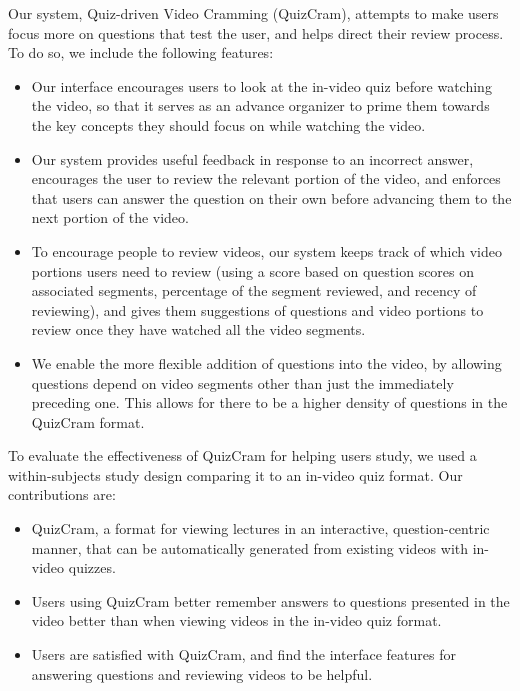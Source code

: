 \documentclass{chi-ext}
\begin{document}
Our system, Quiz-driven Video Cramming (QuizCram), attempts to make users focus more on questions that test the user, and helps direct their review process. To do so, we include the following features:

\begin{itemize}
\item Our interface encourages users to look at the in-video quiz before watching the video, so that it serves as an advance organizer to prime them towards the key concepts they should focus on while watching the video.
\item Our system provides useful feedback in response to an incorrect answer, encourages the user to review the relevant portion of the video, and enforces that users can answer the question on their own before advancing them to the next portion of the video.
\item To encourage people to review videos, our system keeps track of which video portions users need to review (using a score based on question scores on associated segments, percentage of the segment reviewed, and recency of reviewing), and gives them suggestions of questions and video portions to review once they have watched all the video segments.
\item We enable the more flexible addition of questions into the video, by allowing questions depend on video segments other than just the immediately preceding one. This allows for there to be a higher density of questions in the QuizCram format.
\end{itemize}

To evaluate the effectiveness of QuizCram for helping users study, we used a within-subjects study design comparing it to an in-video quiz format. Our contributions are:

\begin{itemize}
\item QuizCram, a format for viewing lectures in an interactive, question-centric manner, that can be automatically generated from existing videos with in-video quizzes.
\item Users using QuizCram better remember answers to questions presented in the video better than when viewing videos in the in-video quiz format.
\item Users are satisfied with QuizCram, and find the interface features for answering questions and reviewing videos to be helpful.
\end{itemize}

\end{document}
